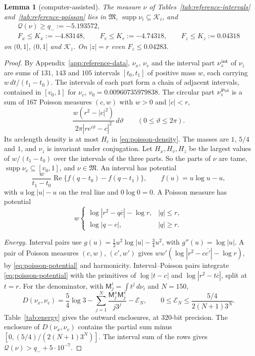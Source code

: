 \documentclass{amsart}
\newtheorem{lemma}{Lemma}[section]
\numberwithin{equation}{section}
\numberwithin{table}{section}
\newcommand{\qminus}{-5.193572}
\newcommand{\Kx}{-4.83148}
\newcommand{\Kv}{-4.74318}
\newcommand{\Kz}{0.04318}
\newcommand{\Kzcirc}{0.04283}
\newcommand{\NE}{150}
\newcommand{\precE}{320}
\newcommand{\vzero}{0.00960735979838}
\begin{document}
\begin{lemma}[computer-assisted]\label{lem:reference-bound}
The measure $\nu$ of Tables~\ref{tab:reference-intervals}
and~\ref{tab:reference-poisson} lies in $\mathfrak M$,
$\operatorname{supp}\nu_i\subseteq\mathcal K_i$, and
\begin{gather}
 \mathcal Q(\nu)\ge q_-:=\qminus,\label{eq:Q-lower}\\
 F_x\le K_x:=\Kx,\qquad F_v\le K_v:=\Kv,
 \qquad F_z\le K_z:=\Kz\label{eq:caps}
\end{gather}
on $(0,1]$, $(0,1]$ and $\mathcal K_z$. On $|z|=r$ even $F_z\le\Kzcirc$.
\end{lemma}
\begin{proof}
By Appendix~\ref{app:reference-data}, $\nu_x$, $\nu_v$ and the interval
part $\nu_z^{\rm int}$ of $\nu_z$ are sums of $131$, $143$ and $105$
intervals $[t_0,t_1]$ of positive mass $w$, each carrying
$w\,dt/(t_1-t_0)$. The intervals of each part form a chain of adjacent
intervals, contained in $[v_0,1]$ for $\nu_v$, $v_0=\vzero$. The circular
part $\nu_z^{\rm Poi}$ is a sum of $167$ Poisson measures $(c,w)$ with
$w>0$ and $|c|<r$,
\[
 \frac{w(r^2-|c|^2)}{2\pi|re^{i\vartheta}-c|^2}\,d\vartheta
 \qquad(0\le\vartheta\le2\pi).
\]
Its arclength density is at most $H_c$ in \eqref{eq:poisson-density}. The
masses are $1$, $5/4$ and $1$, and $\nu_z$ is invariant under
conjugation. Let $H_x,H_v,H_z$ be the largest values of $w/(t_1-t_0)$ over
the intervals of the three parts. So the parts of $\nu$ are tame,
$\operatorname{supp}\nu_v\subseteq[v_0,1]$, and $\nu\in\mathfrak M$. An
interval has potential
\[
 \frac{w}{t_1-t_0}\operatorname{Re}\{f(q-t_0)-f(q-t_1)\},\qquad f(u)=u\log u-u,
\]
with $u\log|u|-u$ on the real line and $0\log0=0$. A Poisson measure has potential
\begin{equation}\label{eq:poisson-potential}
 w\begin{cases}
 \log|r^2-q\overline c|-\log r,&|q|\le r,\\
 \log|q-c|,&|q|\ge r.
 \end{cases}
\end{equation}

\emph{Energy.} Interval pairs use $g(u)=\tfrac12u^2\log|u|-\tfrac34u^2$,
with $g''(u)=\log|u|$. A pair of Poisson measures $(c,w)$, $(c',w')$ gives
$ww'(\log|r^2-c\overline{c'}|-\log r)$, by \eqref{eq:poisson-potential} and
harmonicity. Interval--Poisson pairs integrate \eqref{eq:poisson-potential}
with the primitives of $\log|t-c|$ and $\log|r^2-t\overline c|$, split at
$t=r$. For the denominator, with $\mathsf M_j^i=\int t^j\,d\nu_i$ and
$N=\NE$,
\[
 D(\nu_x,\nu_v)=\frac54\log3-\sum_{j=1}^{N}\frac{\mathsf M_j^x\mathsf M_j^v}{j3^j}-\mathcal E_N,
 \qquad 0\le \mathcal E_N\le\frac{5/4}{2(N+1)3^{N}}.
\]
Table~\ref{tab:energy} gives the outward enclosures, at $\precE$-bit
precision. The enclosure of $D(\nu_x,\nu_v)$ contains the partial sum
minus $[0,(5/4)/(2(N+1)3^N)]$. The interval sum of the rows gives
$\mathcal Q(\nu)>q_-+5\cdot10^{-7}$.


\end{proof}
\end{document}
